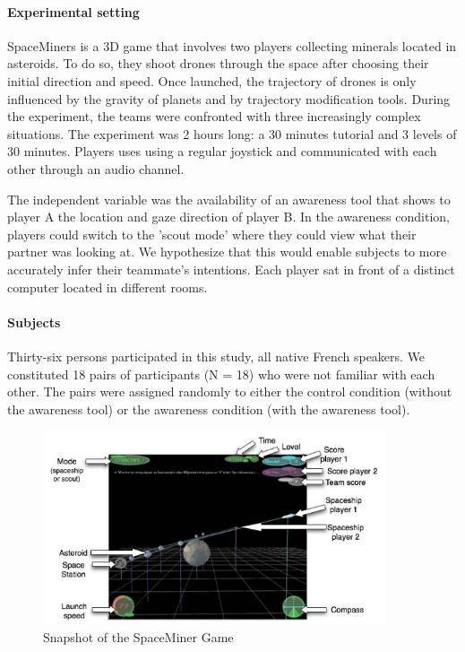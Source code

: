 \documentclass[twocolumn]{article}
\begin{document}
\paragraph{Experimental setting}

SpaceMiners is a 3D game that involves two players collecting minerals located
in asteroids. To do so, they shoot drones through the space after choosing their
initial direction and speed. Once launched, the trajectory of drones is only
influenced by the gravity of planets and by trajectory modification tools.
During the experiment, the teams were confronted with three increasingly complex
situations. The experiment was 2 hours long: a 30 minutes tutorial and 3 levels
of 30 minutes. Players uses using a regular joystick and communicated with each
other through an audio channel.

The independent variable was the availability of an awareness tool that shows to
player A  the location and gaze direction of player B. In the awareness
condition, players could switch to the 'scout mode' where they could view what
their partner was looking at. We hypothesize that this would enable subjects to
more accurately infer their teammate's intentions. Each player sat in front of a
distinct computer located in different rooms. 

\paragraph{Subjects}

Thirty-six persons participated in this study, all native French speakers. We
constituted 18 pairs of participants (N = 18) who were not familiar with each
other. The pairs were assigned randomly to either the control condition (without
the awareness tool) or the awareness condition (with the awareness tool).

\begin{figure}
        \centering
        \includegraphics[width=0.9\textwidth]{image4.png}
        \caption{Snapshot of the SpaceMiner Game}
        \label{spaceminer}
\end{figure}
\end{document}
